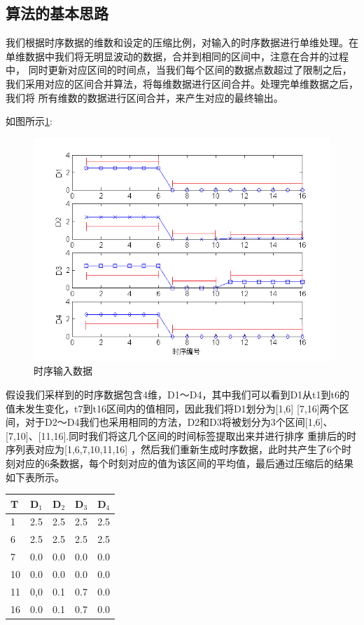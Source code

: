 \subsection{算法的基本思路}
\label{section 3.12}

我们根据时序数据的维数和设定的压缩比例，对输入的时序数据进行单维处理。在单维数据中我们将无明显波动的数据，合并到相同的区间中，注意在合并的过程中，
同时更新对应区间的时间点，当我们每个区间的数据点数超过了限制之后，我们采用对应的区间合并算法，将每维数据进行区间合并。处理完单维数据之后，我们将
所有维数的数据进行区间合并，来产生对应的最终输出。

如图所示\ref{Figure 3-1-1}:

\begin{figure}[h!]
	\centering
	\includegraphics[scale=0.5]{./images/figure-3-1}
	\caption{时序输入数据}
	\label{Figure 3-1-1}
\end{figure}


假设我们采样到的时序数据包含4维，D1～D4，其中我们可以看到D1从t1到t6的值未发生变化，t7到t16区间内的值相同，因此我们将D1划分为[1,6]
[7,16]两个区间，对于D2～D4我们也采用相同的方法，D2和D3将被划分为3个区间[1,6]、[7,10]、[11,16].同时我们将这几个区间的时间标签提取出来并进行排序
重排后的时序列表对应为[1,6,7,10,11,16]
，然后我们重新生成时序数据，此时共产生了6个时刻对应的6条数据，每个时刻对应的值为该区间的平均值，最后通过压缩后的结果如下表所示。

\begin{center}
  \begin{tabular}{ | p{3cm} | p{3cm} | p{3cm} | p{3cm} | p{3cm} | }
    \hline
    T  & D$_{1}$ & D$_{2}$ & D$_{3}$ & D$_{4}$ \\ \hline
    1  & 2.5     & 2.5     & 2.5     & 2.5     \\ \hline
    6  &2.5      &2.5      &2.5      &2.5      \\  \hline
    7  &0.0      &0.0      &0.0      &0.0       \\ \hline
    10 &0.0      &0.0      &0.0      &0.0       \\ \hline
    11 &0,0      &0.1      &0.7      &0.0       \\  \hline
    16 &0.0      &0.1      &0.7      &0.0       \\   
    \hline
  \end{tabular}
\end{center}

